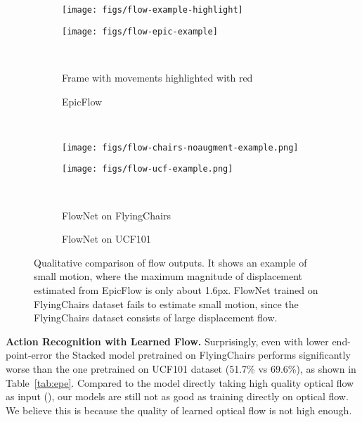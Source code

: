 \documentclass[10pt,twocolumn,letterpaper]{article}
\begin{document}
\begin{figure}[h!]
\begin{center}
  \begin{subfigure}[ht]{0.45\linewidth}
      \texttt{[image: figs/flow-example-highlight]}
  \end{subfigure} 
  \begin{subfigure}[ht]{0.45\linewidth}
      \texttt{[image: figs/flow-epic-example]}
  \end{subfigure}
  \\
  \begin{subfigure}[ht]{0.45\linewidth}
      \caption{Frame with movements highlighted with red}
  \end{subfigure} 
  \begin{subfigure}[ht]{0.45\linewidth}
      \caption{EpicFlow}
  \end{subfigure}
  \vspace{-.5em}
  \\
  \begin{subfigure}[ht]{0.45\linewidth}
      \texttt{[image: figs/flow-chairs-noaugment-example.png]}
  \end{subfigure}
  \begin{subfigure}[ht]{0.45\linewidth}
      \texttt{[image: figs/flow-ucf-example.png]}
  \end{subfigure}
  \\
  \begin{subfigure}[ht]{0.45\linewidth}
      \caption{FlowNet on FlyingChairs}
  \end{subfigure}
  \begin{subfigure}[ht]{0.45\linewidth}
      \caption{FlowNet on UCF101}
  \end{subfigure}

  \vspace{-1em}
  \caption{Qualitative comparison of flow outputs. It shows an example of small motion, where the maximum magnitude of displacement estimated from EpicFlow is only about 1.6px. FlowNet trained on FlyingChairs dataset fails to estimate small motion, since the FlyingChairs dataset consists of large displacement flow.}
  \label{fig:flow-example}
  \vspace{-1.5em}
\end{center}
\end{figure}



\noindent\textbf{Action Recognition with Learned Flow.}
Surprisingly, even with lower end-point-error the Stacked model pretrained on FlyingChairs performs significantly worse than the one pretrained on UCF101 dataset (51.7\% vs 69.6\%), as shown in Table~\ref{tab:epe}.
Compared to the model directly taking high quality optical flow as input (), our models are still not as good as training directly on optical flow.
We believe this is because the quality of learned optical flow is not high enough.
\end{document}

